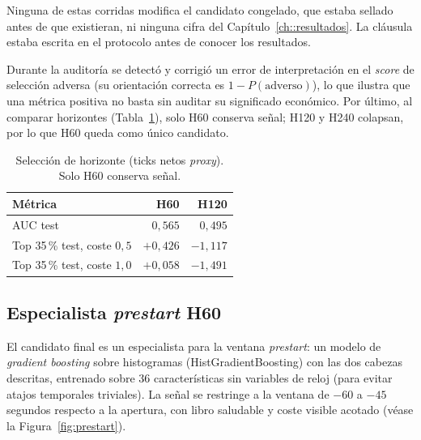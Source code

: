 Ninguna de estas corridas modifica el candidato congelado, que estaba sellado antes de que
existieran, ni ninguna cifra del Capítulo~\ref{ch::resultados}. La cláusula estaba escrita en
el protocolo antes de conocer los resultados.

Durante la auditoría se detectó y corrigió un error de interpretación en el \emph{score} de
selección adversa (su orientación correcta es $1 - P (\text{adverso})$), lo que ilustra que
una métrica positiva no basta sin auditar su significado económico. Por último, al comparar
horizontes (Tabla~\ref{tab:horizonte}), solo H60 conserva señal; H120 y H240 colapsan, por
lo que H60 queda como único candidato.

\begin{table}[h]
\centering
\caption{Selección de horizonte (ticks netos \emph{proxy}). Solo H60 conserva señal.}
\label{tab:horizonte}
\begin{tabular}{lrr}
\toprule
\textbf{Métrica} & \textbf{H60} & \textbf{H120} \\
\midrule
AUC test                       & $0{,}565$ & $0{,}495$ \\
Top 35\,\% test, coste $0{,}5$ & $+0{,}426$ & $-1{,}117$ \\
Top 35\,\% test, coste $1{,}0$ & $+0{,}058$ & $-1{,}491$ \\
\bottomrule
\end{tabular}
\end{table}

\subsection{Especialista \emph{prestart} H60}
\label{sec::especialista}

El candidato final es un especialista para la ventana \emph{prestart}: un modelo de
\emph{gradient boosting} sobre histogramas (HistGradientBoosting) con las dos cabezas
descritas, entrenado sobre 36 características sin variables de reloj (para evitar atajos
temporales triviales). La señal se restringe a la ventana de $-60$ a $-45$ segundos respecto
a la apertura, con libro saludable y coste visible acotado (véase la Figura~\ref{fig:prestart}).

